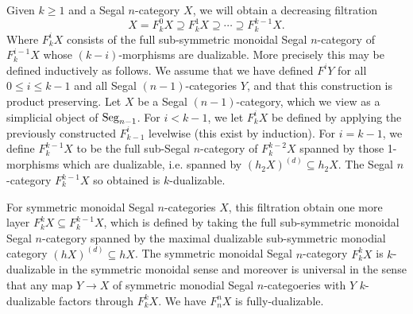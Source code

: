 \documentclass{amsart}
\begin{document}
Given $k \geq 1$ and a Segal $n$-category $X$, we will obtain a decreasing filtration
\begin{equation*}
	X = F^0_k X  \supseteq  F^{1}_kX \supseteq  \cdots \supseteq  F^{k-1}_k X. 
\end{equation*}
Where $F^i_kX$ consists of the full sub-symmetric monoidal Segal $n$-category of $F^{i-1}_kX$ whose $(k-i)$-morphisms are dualizable. More precisely this may be defined inductively as follows. We assume that we have defined $F^iY$ for all $0 \leq i \leq k-1$ and all Segal $(n-1)$-categories $Y$, and that this construction is product preserving. Let $X$ be a Segal $(n-1)$-category, which we view as a simplicial object of $\mathrm{Seg}_{n-1}$. For $i < k-1$, we let $F^i_kX$ be defined by applying the previously constructed $F^i_{k-1}$ levelwise (this exist by induction). For $i=k-1$, we define $F^{k-1}_kX$ to be the full sub-Segal $n$-category of $F^{k-2}_kX$ spanned by those 1-morphisms which are dualizable, i.e. spanned by $(\mathit{h}_2 X)^{(d)} \subseteq \mathit{h}_2 X$. The Segal $n$-category $F^{k-1}_kX$ so obtained is $k$-dualizable. 

For symmetric monoidal Segal $n$-categories $X$, this filtration obtain one more layer $F^k_k X \subseteq F^{k-1}_k X$, which is defined by taking the full sub-symmetric monoidal Segal $n$-category spanned by the maximal dualizable sub-symmetric monodial category $(\mathit{h}X)^{(d)} \subseteq \mathit{h}X$. The symmetric monoidal Segal $n$-category $F^k_k X$ is $k$-dualizable in the symmetric monoidal sense and moreover is universal in the sense that any map $Y \to X$ of symmetric monodial Segal $n$-categoeries with $Y$ $k$-dualizable factors through $F_k^k X$. We have $F_n^n X$ is fully-dualizable. 





\end{document}

